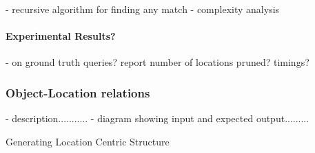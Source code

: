 - recursive algorithm for finding any match
- complexity analysis

\paragraph{Experimental Results?}
- on ground truth queries? report number of locations pruned? timings?




\subsubsection{Object-Location relations}
- description...........
- diagram showing input and expected output.........

\begin{algorithm}
    \caption{Generating Location Centric Structure}\label{alg:locationCentricGeneration}
    \begin{algorithmic}
        \State{- - - - -}
                    \Else
                    \EndIf
                \Else
                    \Else
                    \EndIf
                \EndIf 
            \EndFor
        \EndProcedure
    \end{algorithmic}
\end{algorithm}

